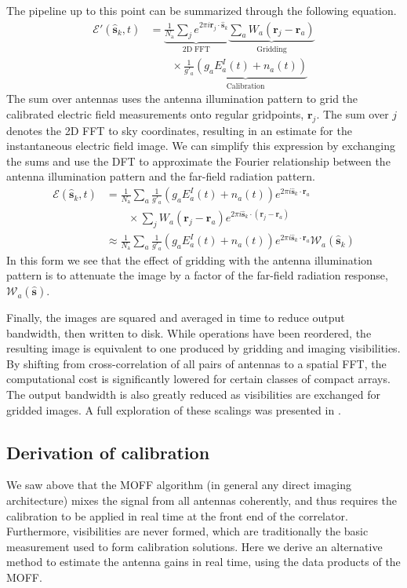 \documentclass[a4paper,fleqn,usenatbib]{mnras}
\newcommand{\Nant}{\ensuremath{N_{\mathrm{a}}}}
\newcommand{\s}{\ensuremath{\hat{\mathbf{s}}}} %
\newcommand{\ra}{\ensuremath{\mathbf{r}_a}}
\begin{document}
The pipeline up to this point can be summarized 
through the following equation.
\begin{align}
\mathcal{E}'(\s_k,t) & = \underbrace{\frac{1}{\Nant} \sum_j e^{2\pi i \mathbf{r}_j \cdot \s_k}}_{\mathrm{2D\;FFT}} 
\underbrace{\sum_a W_a(\mathbf{r}_j - \ra)}_{\mathrm{Gridding}} \\
& \qquad \times \underbrace{ \frac{1}{g'_a} \left(g_a E_a^I(t)+n_a(t)\right)}_{\mathrm{Calibration}} \nonumber
\end{align}
The sum over antennas uses the antenna illumination pattern to grid the calibrated electric field measurements onto 
regular gridpoints, $\mathbf{r}_j$. The sum over $j$ denotes the 2D FFT to sky coordinates, resulting in an 
estimate for the instantaneous electric field image. We can simplify this expression by 
exchanging the sums and use the DFT to approximate the Fourier relationship between
the antenna illumination pattern and the far-field radiation pattern.
\begin{align}\label{eq:epix}
\mathcal{E}(\s_k,t) & = \frac{1}{\Nant} \sum_a \frac{1}{g'_a}\left(g_a E^I_a(t)+n_a(t)\right) e^{2\pi i \s_k \cdot \ra} \nonumber \\
  & \qquad\times \sum_j W_a(\mathbf{r}_j-\ra)e^{2\pi i \s_k \cdot (\mathbf{r}_j-\ra)} \nonumber\\
& \approx \frac{1}{\Nant} \sum_a \frac{1}{g'_a}\left(g_aE^I_a(t)+n_a(t)\right) e^{2\pi i \s_k \cdot \ra}\mathcal{W}_a(\s_k)
\end{align}
In this form we see that the effect of gridding with the antenna illumination pattern is to attenuate 
the image by a factor of the far-field radiation response, $\mathcal{W}_a(\s)$.

Finally, the images are squared and averaged in time to reduce output bandwidth, then written 
to disk. While operations have been reordered, the resulting image is equivalent to one 
produced by gridding and imaging visibilities. By shifting from cross-correlation of all pairs of 
antennas to a spatial FFT, the computational cost is significantly lowered for certain classes of 
compact arrays. The output bandwidth is also greatly reduced as visibilities are exchanged for 
gridded images. A full exploration of these scalings was presented in \citealt{thy15c}.

\subsection{Derivation of calibration}
We saw above that the MOFF algorithm (in general any direct imaging architecture) mixes the 
signal from all antennas coherently, and thus requires the calibration to be applied in real time 
at the front end of the correlator. Furthermore, visibilities are never formed, which are 
traditionally the basic measurement used to form calibration solutions. Here we derive an 
alternative method to estimate the antenna gains in real time, using the data products of the 
MOFF. 
\end{document}
